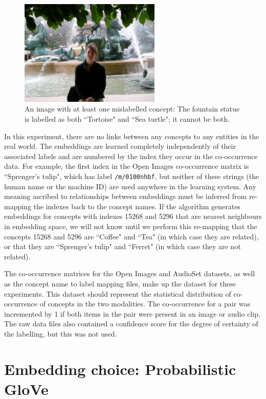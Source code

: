 \begin{figure}[H]
\label{fig:tortoiseseaturtle}
    \centering
    \includegraphics[width=0.6\textwidth]{images/method/tortoise_seaturtle.jpg}
    \caption{
        An image with at least one mislabelled concept: The fountain statue is labelled as both ``Tortoise" and ``Sea turtle"; it cannot be both. 
    }
\end{figure}

In this experiment, there are no links between any concepts to any entities in the real world. The embeddings are learned completely independently of their associated labels and are numbered by the index they occur in the co-occurrence data. For example, the first index in the Open Images co-occurrence matrix is ``Sprenger's tulip", which has label \texttt{/m/0100nhbf}, but neither of these strings (the human name or the machine ID) are used anywhere in the learning system. Any meaning ascribed to relationships between embeddings must be inferred from re-mapping the indexes back to the concept names. If the algorithm generates embeddings for concepts with indexes 15268 and 5296 that are nearest neighbours in embedding space, we will not know until we perform this re-mapping that the concepts 15268 and 5296 are ``Coffee" and ``Tea" (in which case they are related), or that they are ``Sprenger's tulip" and ``Ferret" (in which case they are not related). 

The co-occurrence matrices for the Open Images and AudioSet datasets, as well as the concept name to label mapping files, make up the dataset for these experiments. This dataset should represent the statistical distribution of co-occurrence of concepts in the two modalities. The co-occurrence for a pair was incremented by 1 if both items in the pair were present in an image or audio clip. The raw data files also contained a confidence score for the degree of certainty of the labelling, but this was not used. 

\section{Embedding choice: Probabilistic GloVe}


